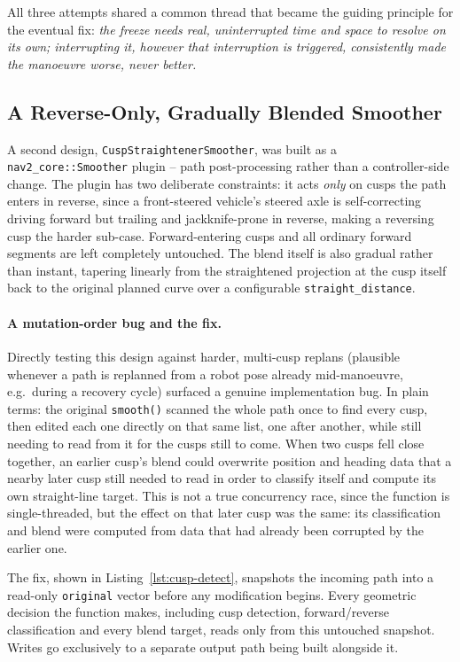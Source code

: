 All three attempts shared a common thread that became the guiding
principle for the eventual fix: \emph{the freeze needs real,
uninterrupted time and space to resolve on its own; interrupting it,
however that interruption is triggered, consistently made the
manoeuvre worse, never better.}

\subsection{A Reverse-Only, Gradually Blended Smoother}
\label{sec:cusp-smoother-v2}

A second design, \texttt{CuspStraightenerSmoother}, was built as a
\texttt{nav2\_core::Smoother} plugin -- path post-processing rather
than a controller-side change. The plugin has two deliberate
constraints: it acts \emph{only} on cusps the path enters in reverse,
since a front-steered vehicle's steered axle is self-correcting
driving forward but trailing and jackknife-prone in reverse, making a
reversing cusp the harder sub-case. Forward-entering cusps and all
ordinary forward segments are left completely untouched. The blend
itself is also gradual rather than instant, tapering linearly from
the straightened projection at the cusp itself back to the original
planned curve over a configurable \texttt{straight\_distance}.

\paragraph{A mutation-order bug and the fix.} Directly testing this
design against harder, multi-cusp replans (plausible whenever a path is
replanned from a robot pose already mid-manoeuvre, e.g.\ during a
recovery cycle) surfaced a genuine implementation bug. In plain terms:
the original \texttt{smooth()} scanned the whole path once to find
every cusp, then edited each one directly on that same list, one after
another, while still needing to read from it for the cusps still to
come. When two cusps fell close together, an earlier cusp's blend
could overwrite position and heading data that a nearby later cusp
still needed to read in order to classify itself and compute its own
straight-line target. This is not a true concurrency race, since the
function is single-threaded, but the effect on that later cusp was the
same: its classification and blend were computed from data that had
already been corrupted by the earlier one.

The fix, shown in Listing~\ref{lst:cusp-detect}, snapshots the
incoming path into a read-only \texttt{original} vector before any
modification begins. Every geometric decision the function makes,
including cusp detection, forward/reverse classification and every
blend target, reads only from this untouched snapshot. Writes go
exclusively to a separate output path being built alongside it.

